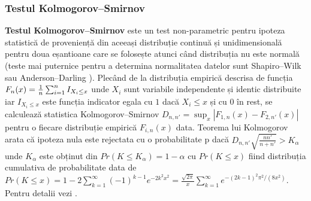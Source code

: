 \documentclass[12pt]{article}
\begin{document}
\subsubsection{Testul Kolmogorov–Smirnov}
 \label{testKS}
 \textbf{Testul Kolmogorov–Smirnov} este un test non-parametric pentru ipoteza statistică de proveniență din aceeași distribuție continuă și unidimensională pentru doua eșantioane care se folosește atunci când distribuția nu este normală (teste mai puternice pentru a determina normalitatea datelor sunt  Shapiro–Wilk sau Anderson–Darling \citep{Stephens74} ). 
 Plecând de la distribuția empirică descrisa de funcția $F_n(x)={1 \over n}\sum_{i=1}^n I_{X_i\leq x}$ unde $X_i$ sunt variabile independente și identic distribuite iar $I_{X_i\leq x}$ este funcția indicator egala cu $1$ dacă $X_i\leq x$ și cu $0$ în rest, se calculează statistica Kolmogorov–Smirnov $D_{n,n'}=\sup_x |F_{1,n}(x)-F_{2,n'}(x)|$ pentru o fiecare distribuție empirică $F_{i,n}(x)$ data. 
 Teorema lui Kolmogorov arata că ipoteza nula este rejectata cu o probabilitate p dacă $D_{n,n'}\sqrt{\frac{n n'}{n + n'}}>K_\alpha$ unde $K_\alpha$ este obținut din $Pr(K\leq K_\alpha)=1-\alpha$ cu $Pr(K\leq x)$ fiind distribuția cumulativa de probabilitate data de $Pr(K\leq x)=1-2\sum_{k=1}^\infty (-1)^{k-1} e^{-2k^2 x^2}=\frac{\sqrt{2\pi}}{x}\sum_{k=1}^\infty e^{-(2k-1)^2\pi^2/(8x^2)}$. 
 Pentru detalii vezi \citep{stuart99}.
\end{document}
